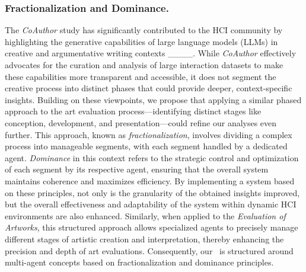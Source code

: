 \subsubsection{Fractionalization and Dominance.}
The \textit{CoAuthor} study has significantly contributed to the HCI community by highlighting the generative capabilities of large language models  (LLMs) in creative and argumentative writing contexts ____. While \textit{CoAuthor} effectively advocates for the curation and analysis of large interaction datasets to make these capabilities more transparent and accessible, it does not segment the creative process into distinct phases that could provide deeper, context-specific insights. Building on these viewpoints, we propose that applying a similar phased approach to the art evaluation process—identifying distinct stages like conception, development, and presentation—could refine our analyses even further. This approach, known as \textit{fractionalization}, involves dividing a complex process into manageable segments, with each segment handled by a dedicated agent. \textit{Dominance} in this context refers to the strategic control and optimization of each segment by its respective agent, ensuring that the overall system maintains coherence and maximizes efficiency. By implementing a system based on these principles, not only is the granularity of the obtained insights improved, but the overall effectiveness and adaptability of the system within dynamic HCI environments are also enhanced. Similarly, when applied to the \textit{Evaluation of Artworks}, this structured approach allows specialized agents to precisely manage different stages of artistic creation and interpretation, thereby enhancing the precision and depth of art evaluations. Consequently, our \dataset~is structured around multi-agent concepts based on fractionalization and dominance principles.
